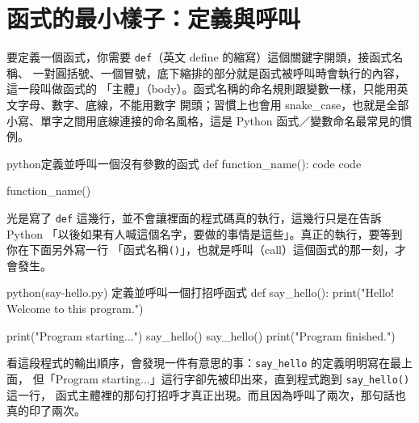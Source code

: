 \section{函式的最小樣子：定義與呼叫}
\label{sec:function-def}

要定義一個函式，你需要 \texttt{def}（英文 define 的縮寫）這個關鍵字開頭，接函式名稱、
一對圓括號、一個冒號，底下縮排的部分就是函式被呼叫時會執行的內容，這一段叫做函式的
「主體」（body）。函式名稱的命名規則跟變數一樣，只能用英文字母、數字、底線，不能用數字
開頭；習慣上也會用 snake\_case，也就是全部小寫、單字之間用底線連接的命名風格，這是
Python 函式／變數命名最常見的慣例。

\begin{code}{python}{定義並呼叫一個沒有參數的函式}
def function_name():
    code
    code

function_name()
\end{code}

光是寫了 \texttt{def} 這幾行，並不會讓裡面的程式碼真的執行，這幾行只是在告訴 Python
「以後如果有人喊這個名字，要做的事情是這些」。真正的執行，要等到你在下面另外寫一行
「函式名稱\texttt{()}」，也就是呼叫（call）這個函式的那一刻，才會發生。

\begin{example}{python}{(say-hello.py) 定義並呼叫一個打招呼函式}
def say_hello():
    print("Hello! Welcome to this program.")


print("Program starting...")
say_hello()
say_hello()
print("Program finished.")
\end{example}


看這段程式的輸出順序，會發現一件有意思的事：\texttt{say\_hello} 的定義明明寫在最上面，
但「Program starting...」這行字卻先被印出來，直到程式跑到 \texttt{say\_hello()} 這一行，
函式主體裡的那句打招呼才真正出現。而且因為呼叫了兩次，那句話也真的印了兩次。


